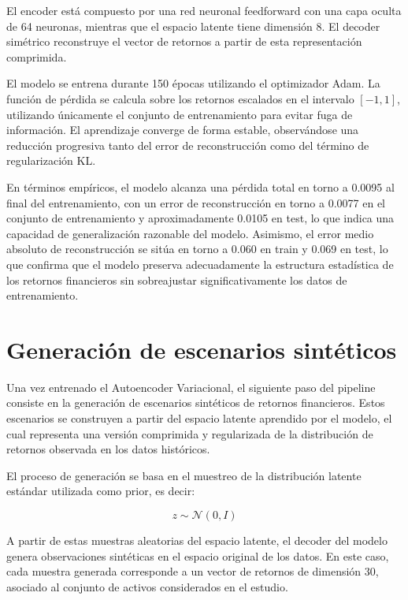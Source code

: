 El encoder está compuesto por una red neuronal feedforward con una capa oculta de 64 neuronas, mientras que el espacio latente tiene dimensión 8. El decoder simétrico reconstruye el vector de retornos a partir de esta representación comprimida.

El modelo se entrena durante 150 épocas utilizando el optimizador Adam. La función de pérdida se calcula sobre los retornos escalados en el intervalo \([-1, 1]\), utilizando únicamente el conjunto de entrenamiento para evitar fuga de información. El aprendizaje converge de forma estable, observándose una reducción progresiva tanto del error de reconstrucción como del término de regularización KL.

En términos empíricos, el modelo alcanza una pérdida total en torno a 0.0095 al final del entrenamiento, con un error de reconstrucción en torno a 0.0077 en el conjunto de entrenamiento y aproximadamente 0.0105 en test, lo que indica una capacidad de generalización razonable del modelo. Asimismo, el error medio absoluto de reconstrucción se sitúa en torno a 0.060 en train y 0.069 en test, lo que confirma que el modelo preserva adecuadamente la estructura estadística de los retornos financieros sin sobreajustar significativamente los datos de entrenamiento.


\section{Generación de escenarios sintéticos}

Una vez entrenado el Autoencoder Variacional, el siguiente paso del pipeline consiste en la generación de escenarios sintéticos de retornos financieros. Estos escenarios se construyen a partir del espacio latente aprendido por el modelo, el cual representa una versión comprimida y regularizada de la distribución de retornos observada en los datos históricos.

El proceso de generación se basa en el muestreo de la distribución latente estándar utilizada como prior, es decir:

\begin{equation}
z \sim \mathcal{N}(0, I)
\end{equation}

A partir de estas muestras aleatorias del espacio latente, el decoder del modelo genera observaciones sintéticas en el espacio original de los datos. En este caso, cada muestra generada corresponde a un vector de retornos de dimensión 30, asociado al conjunto de activos considerados en el estudio.

